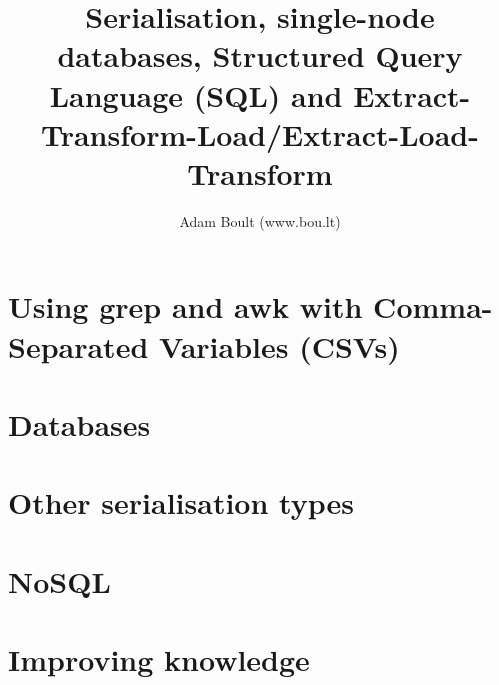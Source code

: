 \documentclass[oneside]{book}
\begin{document}
\author{Adam Boult (www.bou.lt)}
\title{Serialisation, single-node databases, Structured Query Language (SQL) and Extract-Transform-Load/Extract-Load-Transform}
\maketitle

\setcounter{tocdepth}{0}
\tableofcontents



\part{Using grep and awk with Comma-Separated Variables (CSVs)}


\part{Databases}




\part{Other serialisation types}






\part{NoSQL}

\part{Improving knowledge}


\end{document}
